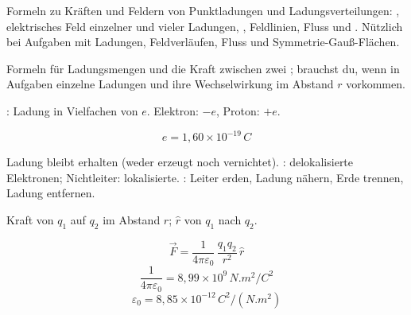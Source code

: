 

\begin{runintext}
Formeln zu Kräften und Feldern von Punktladungen und Ladungsverteilungen: , elektrisches Feld einzelner und vieler Ladungen, , Feldlinien, Fluss und . Nützlich bei Aufgaben mit Ladungen, Feldverläufen, Fluss und Symmetrie-Gauß-Flächen.
\end{runintext}

\begin{runintext}
Formeln für Ladungsmengen und die Kraft zwischen zwei ; brauchst du, wenn in Aufgaben einzelne Ladungen und ihre Wechselwirkung im Abstand $r$ vorkommen.
\end{runintext}
\begin{defbox}[Elementarladung]
: Ladung in Vielfachen von $e$. Elektron: $-e$, Proton: $+e$.
\end{defbox}
\begin{formulabox}
\[ e = 1{,}60 \times 10^{-19}\,\si{C} \]
\end{formulabox}
\begin{runintext}
Ladung bleibt erhalten (weder erzeugt noch vernichtet). : delokalisierte Elektronen; Nichtleiter: lokalisierte. : Leiter erden, Ladung nähern, Erde trennen, Ladung entfernen.
\end{runintext}
\begin{defbox}
Kraft von $q_1$ auf $q_2$ im Abstand $r$; $\hat{r}$ von $q_1$ nach $q_2$.
\end{defbox}
\begin{formulabox}
\[ \vec{F} = \frac{1}{4\pi\varepsilon_0}\,\frac{q_1 q_2}{r^2}\,\hat{r} \]
\formulasep
\[ \frac{1}{4\pi\varepsilon_0} = 8{,}99\times 10^9\,\si{N.m^2/C^2} \]
\[ \varepsilon_0 = 8{,}85\times 10^{-12}\,\si{C^2/(N.m^2)} \]
\end{formulabox}

